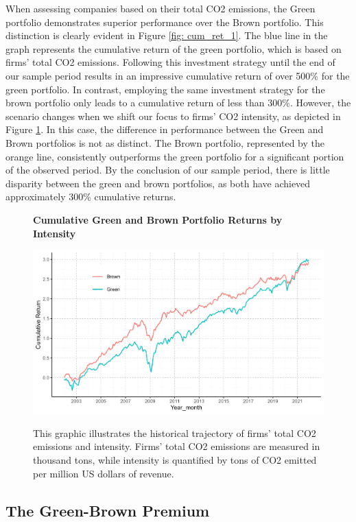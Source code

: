 \documentclass[12pt]{article}
\begin{document}
When assessing companies based on their total CO2 emissions, the Green portfolio demonstrates superior performance over the Brown portfolio. This distinction is clearly evident in Figure \ref{fig: cum_ret_1}. The blue line in the graph represents the cumulative return of the green portfolio, which is based on firms' total CO2 emissions. Following this investment strategy until the end of our sample period results in an impressive cumulative return of over 500\% for the green portfolio. In contrast, employing the same investment strategy for the brown portfolio only leads to a cumulative return of less than 300\%. However, the scenario changes when we shift our focus to firms' CO2 intensity, as depicted in Figure \ref{fig: cum_ret_2}. In this case, the difference in performance between the Green and Brown portfolios is not as distinct. The Brown portfolio, represented by the orange line, consistently outperforms the green portfolio for a significant portion of the observed period. By the conclusion of our sample period, there is little disparity between the green and brown portfolios, as both have achieved approximately 300\% cumulative returns.

\begin{figure}[!ht]
\centering
\caption{\textbf{Cumulative Green and Brown Portfolio Returns by Intensity}}
\includegraphics{image/green_brown_plot_2.png}
\label{fig: cum_ret_2}
\caption*{\footnotesize{This graphic illustrates the historical trajectory of firms' total CO2 emissions and intensity. Firms' total CO2 emissions are measured in thousand tons, while intensity is quantified by tons of CO2 emitted per million US dollars of revenue.}}
\end{figure}

\subsection{The Green-Brown Premium}
\end{document}
